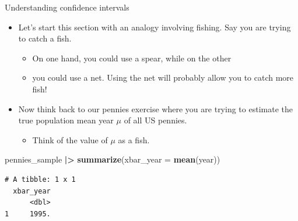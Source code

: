 \documentclass[
  ignorenonframetext,
]{beamer}
\newenvironment{Shaded}{\begin{snugshade}}{\end{snugshade}}
\newcommand{\AttributeTok}[1]{\textcolor[rgb]{0.13,0.29,0.53}{#1}}
\newcommand{\FunctionTok}[1]{\textcolor[rgb]{0.13,0.29,0.53}{\textbf{#1}}}
\newcommand{\NormalTok}[1]{#1}
\newcommand{\SpecialCharTok}[1]{\textcolor[rgb]{0.81,0.36,0.00}{\textbf{#1}}}
\providecommand{\tightlist}{%
  \setlength{\itemsep}{0pt}\setlength{\parskip}{0pt}}
\begin{document}
\begin{frame}[fragile]{Understanding confidence intervals}
\label{understanding-confidence-intervals-1}
\begin{itemize}
\item
  Let's start this section with an analogy involving fishing. Say you
  are trying to catch a fish.

  \begin{itemize}
  \tightlist
  \item
    On one hand, you could use a spear, while on the other
  \item
    you could use a net. Using the net will probably allow you to catch
    more fish!
  \end{itemize}
\item
  Now think back to our pennies exercise where you are trying to
  estimate the true population mean year \(\mu\) of all US pennies.

  \begin{itemize}
  \tightlist
  \item
    Think of the value of \(\mu\) as a fish.
  \end{itemize}
\end{itemize}

\begin{Shaded}
\begin{Highlighting}[]
\NormalTok{pennies\_sample }\SpecialCharTok{|\textgreater{}} 
  \FunctionTok{summarize}\NormalTok{(}\AttributeTok{xbar\_year =} \FunctionTok{mean}\NormalTok{(year))}
\end{Highlighting}
\end{Shaded}

\begin{verbatim}
# A tibble: 1 x 1
  xbar_year
      <dbl>
1     1995.
\end{verbatim}
\end{frame}
\end{document}
